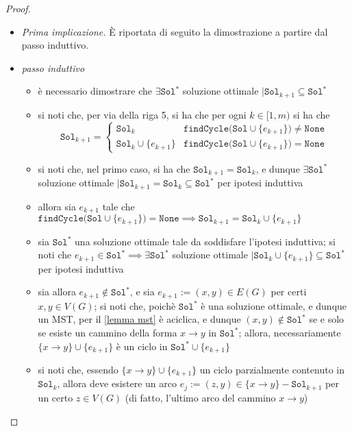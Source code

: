 \documentclass[14pt]{extreport}
\theoremstyle{definition}
\theoremstyle{definition}
\begin{document}
\begin{proof}
    \begin{itemize}
        \item[] \textit{Prima implicazione.} È riportata di seguito la dimostrazione a partire dal passo induttivo. 
        \item \textit{passo induttivo}
            \begin{itemize}
                \item è necessario dimostrare che $\exists \texttt{Sol}^*$ soluzione ottimale $\mid \texttt{Sol}_{k + 1} \subseteq \texttt{Sol}^*$
                \item si noti che, per via della riga 5, si ha che per ogni $k \in [1, m)$ si ha che $$\texttt{Sol}_{k +1} = \left \{ \begin{array}{ll} \texttt{Sol}_k & \texttt{findCycle(Sol} \cup \{e_{k +1}\} \texttt{)} \neq \texttt{None} \\ \texttt{Sol}_k \cup \{e_{k +1}\} & \texttt{findCycle(Sol} \cup \{e_{k +1}\} \texttt{)} = \texttt{None} \end{array} \right.$$
                \item si noti che, nel primo caso, si ha che $\texttt{Sol}_{k +1} = \texttt{Sol}_k$, e dunque $\exists \texttt{Sol}^*$ soluzione ottimale $\mid \texttt{Sol}_{k +1} = \texttt{Sol}_k \subseteq \texttt{Sol}^*$ per ipotesi induttiva
                \item allora sia $e_{k + 1}$ tale che $\texttt{findCycle(Sol} \cup \{e_{k +1}\} \texttt{)} = \texttt{None} \implies \texttt{Sol}_{k +1} = \texttt{Sol}_k \cup \{e_{k +1}\}$
                \item sia $\texttt{Sol}^*$ una soluzione ottimale tale da soddisfare l'ipotesi induttiva; si noti che $e_{k +1} \in \texttt{Sol}^* \implies \exists \texttt{Sol}^*$ soluzione ottimale $\mid \texttt{Sol}_k \cup \{ e_{k +1}\} \subseteq \texttt{Sol}^*$ per ipotesi induttiva
                \item sia allora $e_{k +1} \notin \texttt{Sol}^*$, e sia $e_{k+1}:=(x, y) \in E(G)$ per certi $x, y \in V(G)$; si noti che, poichè $\texttt{Sol}^*$ è una soluzione ottimale, e dunque un MST, per il \cref{lemma mst} è aciclica, e dunque $(x, y) \notin \texttt{Sol}^*$ se e solo se esiste un cammino della forma $x \rightarrow y$ in $\texttt{Sol}^*$; allora, necessariamente $\{x \rightarrow y\} \cup \{e_{k +1}\}$ è un ciclo in $\texttt{Sol}^* \cup \{e_{k +1}\}$
                \item si noti che, essendo $\{x \rightarrow y\} \cup \{e_{k +1}\}$ un ciclo parzialmente contenuto in $\texttt{Sol}_k$, allora deve esistere un arco $e_j := (z, y) \in \{x \rightarrow y\} - \texttt{Sol}_{k +1}$ per un certo $z \in V(G)$ (di fatto, l'ultimo arco del cammino $x \rightarrow y$)

\end{itemize}
\end{itemize}
\end{proof}
\end{document}
